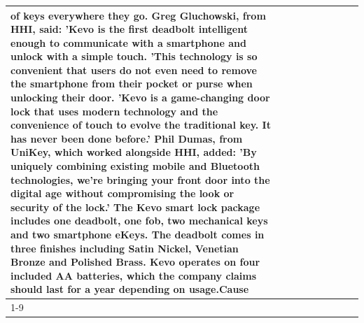 \begin{table}[H]
\begin{tabular}{lllrlllll}
of keys everywhere they go. Greg Gluchowski, from HHI, said: 'Kevo is the first deadbolt intelligent enough to communicate with a smartphone and unlock with a simple touch. 'This technology is so convenient that users do not even need to remove the smartphone from their pocket or purse when unlocking their door. 'Kevo is a game-changing door lock that uses modern technology and the convenience of touch to evolve the traditional key. It has never been done before.' Phil Dumas, from UniKey, which worked alongside HHI, added: 'By uniquely combining existing mobile and Bluetooth technologies, we’re bringing your front door into the digital age without compromising the look or security of the lock.' The Kevo smart lock package includes one deadbolt, one fob, two mechanical keys and two smartphone eKeys. The deadbolt comes in three finishes including Satin Nickel, Venetian Bronze and Polished Brass. Kevo operates on four included AA batteries, which the company claims should last for a year depending on usage.Cause \\
\cline{1-9}

\end{tabular}
\end{table}
